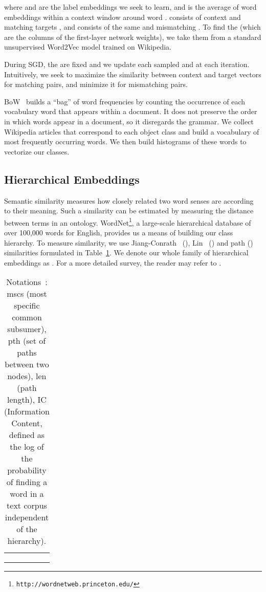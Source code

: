 \documentclass[10pt,twocolumn,letterpaper]{article}
\newcommand{\cutcaptiondown}{\vspace*{-0.12in}}
\newcommand{\myparagraph}[1]{\vspace{2pt}\noindent{\bf #1}}
\begin{document}
where  and  are the label embeddings we seek to learn, and  is the average of word embeddings  within a context window around word . 
 consists of context  
and matching targets , and  consists of the same  and mismatching . 
To find the  (which are the columns of the first-layer network weights), we take them from a standard unsupervised Word2Vec model trained on Wikipedia.

During SGD, the  are fixed and we update each sampled  and  at each iteration.
Intuitively, we seek to maximize the similarity between context and target vectors for matching pairs, and minimize it for mismatching pairs.

\myparagraph{Bag-of-Words ().} BoW~\cite{H54} builds a ``bag'' of word frequencies by counting the occurrence of each vocabulary word that appears within a document. It does not preserve the order in which words appear in a document, so it disregards the grammar. We collect Wikipedia articles that correspond to each object class and build a vocabulary of most frequently occurring words. We then build histograms of these words to vectorize our classes. 


\subsection{Hierarchical Embeddings}
\label{subsec:hie}
Semantic similarity measures how closely related two word senses are according to their meaning. Such a similarity can be estimated by measuring the distance between terms in an ontology. WordNet\footnote{\texttt{http://wordnetweb.princeton.edu/}}, a large-scale hierarchical database of over 100,000 words for English, provides us a means of building our class hierarchy. 
To measure similarity, we use Jiang-Conrath~\cite{JC97} (), Lin~\cite{Lin98} () and path () similarities formulated in Table~\ref{tab:similairty}. We denote our whole family of hierarchical embeddings as . For a more detailed survey, the reader may refer to \cite{BHBKP05}.

\begin{table}[t]
 \begin{center}
   \small
{\renewcommand{\arraystretch}{1.5}
  \begin{tabular}{l}
	\hline
	\hline
	  \vspace{1mm}\\
	   \\
	 \vspace{1mm} \\ 
	\hline
	\hline	
  \end{tabular}
} 
 \end{center}
\caption{Notations~\cite{BHBKP05}: mscs (most specific common subsumer), pth (set of paths between two nodes), len (path length), IC (Information Content, defined as the log of the probability of finding a word in a text corpus independent of the hierarchy).} 
\cutcaptiondown
\label{tab:similairty}
\end{table}
\end{document}
